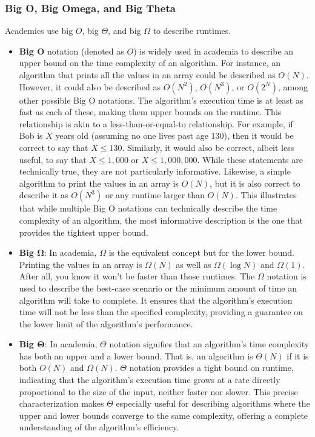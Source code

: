 \documentclass{report}
\begin{document}
    \subsubsection{Big O, Big Omega, and Big Theta}
    \bigbreak \noindent 
    Academics use big $O$, big $\Theta$, and big $\Omega$ to describe runtimes.
    \begin{itemize}
        \item \textbf{Big $\mathbf{O}$} notation (denoted as $O$) is widely used in academia to describe an upper bound on the time complexity of an algorithm. For instance, an algorithm that prints all the values in an array could be described as $O(N)$. However, it could also be described as $O(N^2)$, $O(N^3)$, or $O(2^N)$, among other possible Big O notations. The algorithm's execution time is at least as fast as each of these, making them upper bounds on the runtime. This relationship is akin to a less-than-or-equal-to relationship. For example, if Bob is $X$ years old (assuming no one lives past age 130), then it would be correct to say that $X \leq 130$. Similarly, it would also be correct, albeit less useful, to say that $X \leq 1,000$ or $X \leq 1,000,000$. While these statements are technically true, they are not particularly informative. Likewise, a simple algorithm to print the values in an array is $O(N)$, but it is also correct to describe it as $O(N^3)$ or any runtime larger than $O(N)$. This illustrates that while multiple Big O notations can technically describe the time complexity of an algorithm, the most informative description is the one that provides the tightest upper bound.
        \item \textbf{Big $\mathbf{\Omega}$}: In academia, $\Omega$ is the equivalent concept but for the lower bound. Printing the values in an array is $\Omega(N)$ as well as $\Omega(\log N)$ and $\Omega(1)$. After all, you know it won’t be faster than those runtimes. The $\Omega$ notation is used to describe the best-case scenario or the minimum amount of time an algorithm will take to complete. It ensures that the algorithm's execution time will not be less than the specified complexity, providing a guarantee on the lower limit of the algorithm's performance.
        \item \textbf{Big $\mathbf{\Theta}$}: In academia, $\Theta$ notation signifies that an algorithm's time complexity has both an upper and a lower bound. That is, an algorithm is $\Theta(N)$ if it is both $O(N)$ and $\Omega(N)$. $\Theta$ notation provides a tight bound on runtime, indicating that the algorithm's execution time grows at a rate directly proportional to the size of the input, neither faster nor slower. This precise characterization makes $\Theta$ especially useful for describing algorithms where the upper and lower bounds converge to the same complexity, offering a complete understanding of the algorithm's efficiency.
    \end{itemize}
    \bigbreak \noindent 
\end{document}
